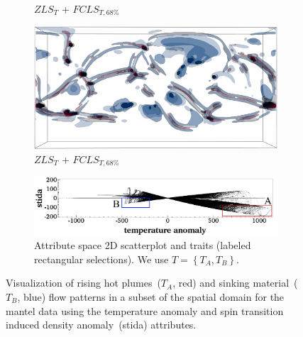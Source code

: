 \begin{figure}[!h]
\begin{subfigure}{0.2\linewidth}
\vspace{-5mm}
\caption{$ZLS_{T}$ + $FCLS_{T,68\%}$}
\label{fig:mantel_fls}
\end{subfigure}
\begin{subfigure}{0.295\linewidth}
\centering
\includegraphics[width=0.9\linewidth]{Images/Mantel/fcls_68_v2.pdf}
\caption{$ZLS_{T}$ + $FCLS_{T,68\%}$}
\label{fig:mantel_fcls}
\end{subfigure}
\hfill
\begin{subfigure}{0.295\linewidth}
\centering
\includegraphics[width=\linewidth]{Images/Mantel/scatterplot.pdf}
\caption{Attribute space 2D scatterplot and traits (labeled rectangular selections). We use $T = \left\{T_{A}, T_{B}\right\}$.} 
\label{fig:mantel_scatterplot}
\end{subfigure}
\vspace{-2mm}
\caption{Visualization of rising hot plumes~($T_{A}$, red) and sinking material~($T_{B}$, blue) flow patterns in a subset of the spatial domain for the mantel data using the temperature anomaly and spin transition induced density anomaly~(stida) attributes.}
\label{fig:mantel}
\end{figure}
